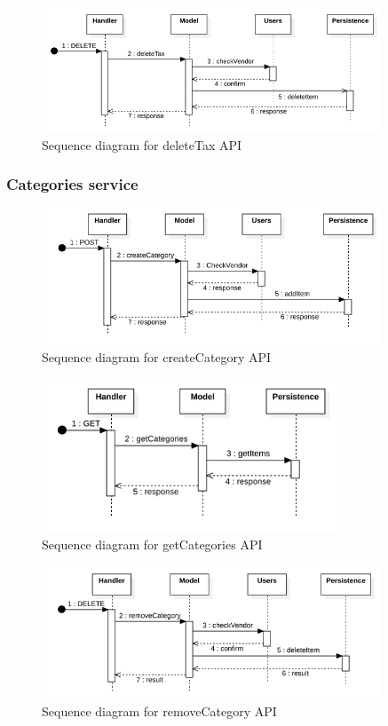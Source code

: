 \begin{figure}[H]
    \includegraphics[width=0.9\textwidth]{res/images/sequence-diagrams/taxes/deleteTax.png}
    \caption{Sequence diagram for deleteTax API}
\end{figure}

\subsubsection{Categories service}
\begin{figure}[H]
    \includegraphics[width=0.9\textwidth]{res/images/sequence-diagrams/categories/createCategory.png}
    \caption{Sequence diagram for createCategory API}
\end{figure}

\begin{figure}[H]
    \includegraphics[width=0.8\textwidth]{res/images/sequence-diagrams/categories/getCategories.png}
    \caption{Sequence diagram for getCategories API}
\end{figure}

\begin{figure}[H]
    \includegraphics[width=0.9\textwidth]{res/images/sequence-diagrams/categories/removeCategory.png}
    \caption{Sequence diagram for removeCategory API}
\end{figure}

